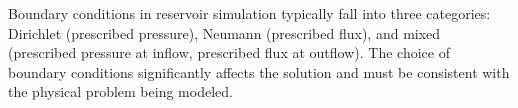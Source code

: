 Boundary conditions in reservoir simulation typically fall into three categories: Dirichlet (prescribed pressure), Neumann (prescribed flux), and mixed (prescribed pressure at inflow, prescribed flux at outflow). The choice of boundary conditions significantly affects the solution and must be consistent with the physical problem being modeled.
